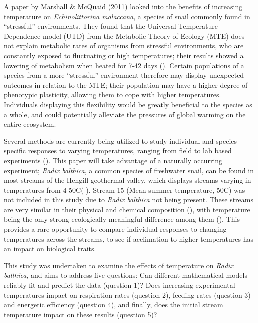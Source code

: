 \documentclass[../../Paper.tex]{subfiles}
\begin{document}
A paper by Marshall \& McQuaid (2011) looked into the 
benefits of increasing temperature on \textit{Echinolittorina malaccana}, a species of snail 
commonly found in ``stressful'' environments. They found that the Universal Temperature 
Dependence model (UTD) from the Metabolic Theory of Ecology (MTE) does not explain metabolic rates 
of organisms from stressful environments, who are constantly exposed to fluctuating or high 
temperatures; their results showed a lowering of metabolism when heated for 7-42 days 
(\cite{marshall_warming_2011}). Certain populations of a species from a more ``stressful'' 
environment therefore may display unexpected outcomes in relation to the MTE; their 
population may have a higher degree of phenotypic plasticity, allowing them to cope with 
higher temperatures. Individuals  displaying this flexibility would be 
greatly beneficial to the species as a whole, and could potentially alleviate the 
pressures of global warming on the entire ecosystem. 

Several methods are currently being utilized to study individual and species specific responses
to varying temperatures, ranging from field to lab based experiments (\cite{schulte_thermal_2011,brusch_turn_2016}).
This paper will take advantage of a naturally occurring experiment; \textit{Radix balthica}, a common
species of freshwater snail, can be found in most streams of the Hengill geothermal valley, which
displays streams varying in temperatures from 4-50\degree C(
\cite{friberg_relationships_2009,ogorman_chapter_2012}). Stream 15 (Mean summer temperature, 50\degree C) was not included in this study
due to \textit{Radix balthica} not being present. These streams are very similar in their physical and chemical 
composition (\cite{ogorman_chapter_2012}), with temperature being the only strong 
ecologically meaningful difference among them (\cite{friberg_relationships_2009}). This provides a rare opportunity
to compare individual responses to changing temperatures across the streams, to see if 
acclimation to higher temperatures has an impact on biological traits. 

This study was undertaken to examine the effects of temperature on \textit{Radix balthica}, and
aims to address five questions: Can different mathematical models reliably fit and predict the data (question 1)?
Does increasing experimental 
temperatures impact on respiration rates (question 2), feeding rates (question 3) and energetic 
efficiency (question 4), and finally, does the initial stream temperature impact on these results (question 5)?
\end{document}

